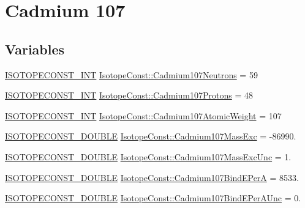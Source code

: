 \hypertarget{group___isotope_const-_cadmium-_cd107}{}\section{Cadmium 107}
\label{group___isotope_const-_cadmium-_cd107}
\subsection*{Variables}
\begin{DoxyCompactItemize}
\item 
\mbox{\hyperlink{group___isotope_const-_macros_ga5f18360b3e99483a35c32d789e62621c}{I\+S\+O\+T\+O\+P\+E\+C\+O\+N\+S\+T\+\_\+\+I\+NT}} \mbox{\hyperlink{group___isotope_const-_cadmium-_cd107_ga3ef2168c2ab4a4386367c4a48f07c79c}{Isotope\+Const\+::\+Cadmium107\+Neutrons}} = 59
\item 
\mbox{\hyperlink{group___isotope_const-_macros_ga5f18360b3e99483a35c32d789e62621c}{I\+S\+O\+T\+O\+P\+E\+C\+O\+N\+S\+T\+\_\+\+I\+NT}} \mbox{\hyperlink{group___isotope_const-_cadmium-_cd107_ga4f905be7c30fbb0c31247ca40a2ea65f}{Isotope\+Const\+::\+Cadmium107\+Protons}} = 48
\item 
\mbox{\hyperlink{group___isotope_const-_macros_ga5f18360b3e99483a35c32d789e62621c}{I\+S\+O\+T\+O\+P\+E\+C\+O\+N\+S\+T\+\_\+\+I\+NT}} \mbox{\hyperlink{group___isotope_const-_cadmium-_cd107_ga2baeb1d5a1f7f430f23e312dc528d41c}{Isotope\+Const\+::\+Cadmium107\+Atomic\+Weight}} = 107
\item 
\mbox{\hyperlink{group___isotope_const-_macros_ga8f45a7272ce02c0b4c65c44636ed719a}{I\+S\+O\+T\+O\+P\+E\+C\+O\+N\+S\+T\+\_\+\+D\+O\+U\+B\+LE}} \mbox{\hyperlink{group___isotope_const-_cadmium-_cd107_ga6fe8e1defdd8b0664dfb27195880ed9b}{Isotope\+Const\+::\+Cadmium107\+Mass\+Exc}} = -\/86990.
\item 
\mbox{\hyperlink{group___isotope_const-_macros_ga8f45a7272ce02c0b4c65c44636ed719a}{I\+S\+O\+T\+O\+P\+E\+C\+O\+N\+S\+T\+\_\+\+D\+O\+U\+B\+LE}} \mbox{\hyperlink{group___isotope_const-_cadmium-_cd107_gac3fdb6ae37864e73585d9db11727c39a}{Isotope\+Const\+::\+Cadmium107\+Mass\+Exc\+Unc}} = 1.
\item 
\mbox{\hyperlink{group___isotope_const-_macros_ga8f45a7272ce02c0b4c65c44636ed719a}{I\+S\+O\+T\+O\+P\+E\+C\+O\+N\+S\+T\+\_\+\+D\+O\+U\+B\+LE}} \mbox{\hyperlink{group___isotope_const-_cadmium-_cd107_gae027a55822d32feb24c123fc11f98271}{Isotope\+Const\+::\+Cadmium107\+Bind\+E\+PerA}} = 8533.
\item 
\mbox{\hyperlink{group___isotope_const-_macros_ga8f45a7272ce02c0b4c65c44636ed719a}{I\+S\+O\+T\+O\+P\+E\+C\+O\+N\+S\+T\+\_\+\+D\+O\+U\+B\+LE}} \mbox{\hyperlink{group___isotope_const-_cadmium-_cd107_gaffd3544d613d0fe8df25ebc474e1380c}{Isotope\+Const\+::\+Cadmium107\+Bind\+E\+Per\+A\+Unc}} = 0.

\end{DoxyCompactItemize}
